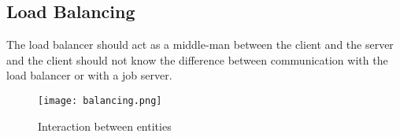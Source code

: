 \documentclass[10pt, oneside,english]{article}
\begin{document}
    \subsection{Load Balancing}\label{subsec:balancing}

    The load balancer should act as a middle-man between the client and the server
    and the client should not know the difference between communication with
    the load balancer or with a job server.

    \begin{figure}
        \centering
        \texttt{[image: balancing.png]}
        \caption{Interaction between entities}
    \end{figure}
\end{document}
